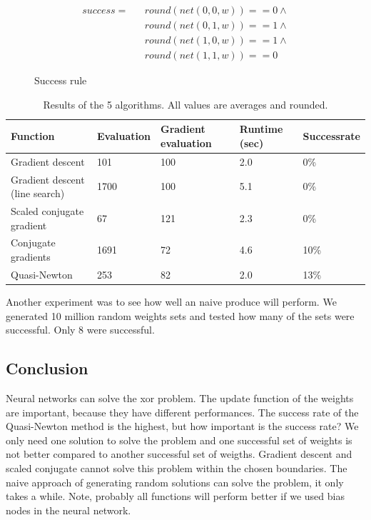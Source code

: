 \documentclass{article}
\begin{document}
\begin{figure}[H]
	\centering
	\begin{eqnarray}
		success =&& round(net(0, 0, w)) == 0 \wedge \\
				&& round(net(0, 1, w)) == 1 \wedge \\
				&& round(net(1, 0, w)) == 1 \wedge \\
			&& round(net(1, 1, w)) == 0
	\end{eqnarray}
	\caption{Success rule}
	\label{fig:sr}
\end{figure}



\begin{table}[H]
	\centering
	\begin{tabular}{| l | l | l | l | l |}
		\hline
		Function & Evaluation & Gradient evaluation & Runtime (sec) & Successrate \\ \hline
		Gradient descent & 101 & 100 & 2.0 & 0\% \\ \hline
		Gradient descent (line search) & 1700 & 100 & 5.1 & 0\% \\ \hline
		Scaled conjugate gradient & 67 & 121 & 2.3 & 0\% \\ \hline
		Conjugate gradients & 1691 & 72 & 4.6 & 10\% \\ \hline
		Quasi-Newton & 253 & 82 & 2.0 & 13\% \\ \hline
	\end{tabular}
	\caption{Results of the 5 algorithms. All values are averages and rounded.}
	\label{table:results}
\end{table}

Another experiment was to see how well an naive produce will perform. We generated 10 million random weights sets and tested how many of the sets were successful. Only 8 were successful. 

\subsection{Conclusion}
Neural networks can solve the xor problem. The update function of the weights are important, because they have different performances. The success rate of the Quasi-Newton method is the highest, but how important is the success rate? We only need one solution to solve the problem and one successful set of weights is not better compared to another successful set of weigths. Gradient descent and scaled conjugate cannot solve this problem within the chosen boundaries. The naive approach of generating random solutions can solve the problem, it only takes a while. Note, probably all functions will perform better if we used bias nodes in the neural network.
\end{document}
